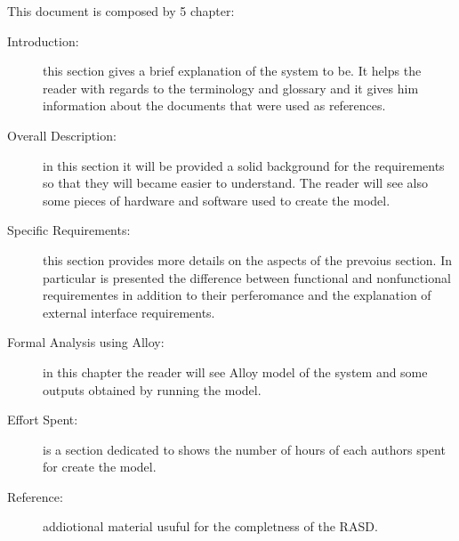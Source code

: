 This document is composed by 5 chapter:
\begin{description}
	\item[Introduction:] this section gives a brief explanation of the system to be. It helps the reader with regards to the terminology and glossary and it gives him information about the documents that were used as references. 
	
	\item[Overall Description:] in this section it will be provided a solid background for the requirements so that they will became easier to understand. The reader will see also some pieces of hardware and software used to create the model.
	
	\item[Specific Requirements:] this section provides more details on the aspects of the prevoius section. In particular is presented the difference between functional and nonfunctional requirementes in addition to their perferomance and the explanation of external interface requirements.
	
	\item[Formal Analysis  using Alloy:] in this chapter the reader will see Alloy model of the system and some outputs obtained by running the model.
	
	\item[Effort Spent:]  is a section dedicated to shows the number of hours of each authors spent for create the model. 
	
	\item[Reference: ] addiotional material usuful for the completness of the RASD.
\end{description}
